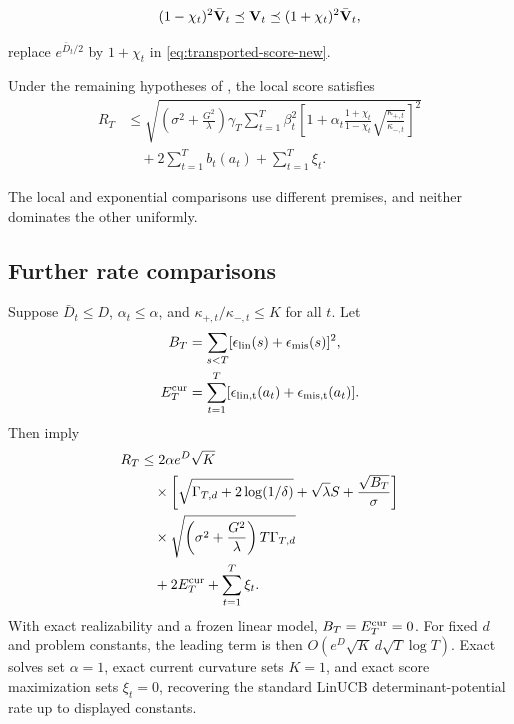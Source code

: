 \begin{equation}\label{eq:local-additive-new}
 (1-\chi_t)^2\bar{\mathbf{V}}_t\preceq\mathbf{V}_t
 \preceq(1+\chi_t)^2\bar{\mathbf{V}}_t,
\end{equation}

replace $e^{\bar D_t/2}$ by $1+\chi_t$ in
\eqref{eq:transported-score-new}.

\begin{corollary}
\label{cor:local-small-drift-new}
Under the remaining hypotheses of , the local score
satisfies
\begin{align}
R_T
&\le\sqrt{\left(\sigma^2+\frac{G^2}{\lambda}\right)\gamma_T
\sum_{t=1}^T\beta_t^2
\left[1+\alpha_t\frac{1+\chi_t}{1-\chi_t}
\sqrt{\frac{\kappa_{+,t}}{\kappa_{-,t}}}\right]^2}
\nonumber\\
&\quad+2\sum_{t=1}^Tb_t(a_t)+\sum_{t=1}^T\xi_t.
\label{eq:local-small-drift-regret-new}
\end{align}
\end{corollary}

The local and exponential comparisons use different premises, and neither
dominates the other uniformly.

\subsection{Further rate comparisons}

\begin{corollary}
\label{cor:finite-d-rate-new}
Suppose $\bar D_t\le D$, $\alpha_t\le\alpha$, and
$\kappa_{+,t}/\kappa_{-,t}\le K$ for all $t$.  Let
\begin{align*}
 B_T&=\sum_{s<T}[\epsilon_{\rm lin}(s)+\epsilon_{\rm mis}(s)]^2,\\
 E_T^{\rm cur}&=\sum_{t=1}^T
 [\epsilon_{\rm lin,t}(a_t)+\epsilon_{\rm mis,t}(a_t)].
\end{align*}
Then  imply
\begin{align}
R_T
&\le2\alpha e^D\sqrt K\nonumber\\
&\quad{}\times
\left[\sqrt{\Gamma_{T,d}+2\log(1/\delta)}+\sqrt\lambda S
+\frac{\sqrt{B_T}}{\sigma}\right]\nonumber\\
&\quad{}\times
\sqrt{\left(\sigma^2+\frac{G^2}{\lambda}\right)T\Gamma_{T,d}}
\nonumber\\
&\quad+2E_T^{\rm cur}+\sum_{t=1}^T\xi_t.
\label{eq:finite-d-rate-new-display}
\end{align}
With exact realizability and a frozen linear model, $B_T=E_T^{\rm cur}=0$.
For fixed $d$ and problem constants, the leading term is then
$O(e^D\sqrt K\,d\sqrt T\log T)$.  Exact solves set $\alpha=1$, exact current
curvature sets $K=1$, and exact score maximization sets $\xi_t=0$, recovering
the standard LinUCB determinant-potential rate up to displayed constants.
\end{corollary}

